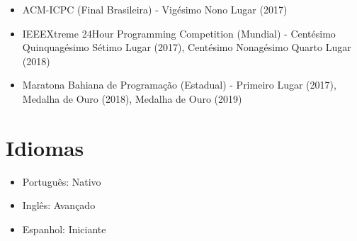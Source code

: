 \documentclass[11pt,a4paper,sans]{moderncv}
\begin{document}
\begin{itemize}
  \item ACM-ICPC (Final Brasileira) - Vigésimo Nono Lugar (2017)
  
  \vspace{6pt}
  
  \item IEEEXtreme 24Hour Programming Competition (Mundial) - Centésimo Quinquagésimo Sétimo Lugar (2017), Centésimo Nonagésimo Quarto Lugar (2018)
  
  \vspace{6pt}
  
  \item Maratona Bahiana de Programação (Estadual) - Primeiro Lugar (2017), Medalha de Ouro (2018), Medalha de Ouro (2019)
\end{itemize}

\section{Idiomas}
 
\begin{itemize}

\item{Português: Nativo}
\vspace{6pt}
\item{Inglês: Avançado}
\vspace{6pt}
\item{Espanhol: Iniciante}

\end{itemize}

\nocite{*}



\end{document}
